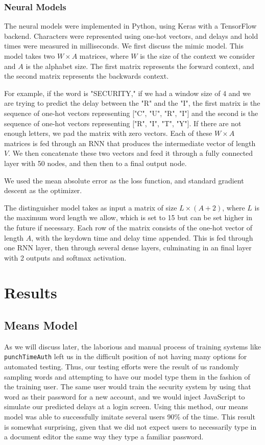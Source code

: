 \documentclass[9pt,journal]{IEEEtran}
\begin{document}
\subsubsection{Neural Models}
The neural models were implemented in Python, using Keras with a TensorFlow backend. Characters were represented using one-hot vectors, and delays and hold times were measured in milliseconds. We first discuss the mimic model. This model takes two $W \times A$ matrices, where $W$ is the size of the context we consider and $A$ is the alphabet size. The first matrix represents the forward context, and the second matrix represents the backwards context.

For example, if the word is "SECURITY," if we had a window size of 4 and we are trying to predict the delay between the "R" and the "I", the first matrix is the sequence of one-hot vectors representing ["C", "U", "R", "I"] and the second is the sequence of one-hot vectors representing ["R", "I", "T", "Y"]. If there are not enough letters, we pad the matrix with zero vectors. Each of these $W \times A$ matrices is fed through an RNN that produces the intermediate vector of length $V$. We then concatenate these two vectors and feed it through a fully connected layer with 50 nodes, and then then to a final output node.

We used the mean absolute error as the loss function, and standard gradient descent as the optimizer.

The distinguisher model takes as input a matrix of size $L \times (A + 2)$, where $L$ is the maximum word length we allow, which is set to 15 but can be set higher in the future if necessary. Each row of the matrix consists of the one-hot vector of length $A$, with the keydown time and delay time appended. This is fed through one RNN layer, then through several dense layers, culminating in an final layer with 2 outputs and softmax activation.

\section{Results}
\subsection{Means Model}

As we will discuss later, the laborious and manual process of training systems like \texttt{punchTimeAuth} left us in the difficult position of not having many options for automated testing. Thus, our testing efforts were the result of us randomly sampling words and attempting to have our model type them in the fashion of the training user. The same user would train the security system by using that word as their password for a new account, and we would inject JavaScript to simulate our predicted delays at a login screen. Using this method, our means model was able to successfully imitate several users 90\% of the time. This result is somewhat surprising, given that we did not expect users to necessarily type in a document editor the same way they type a familiar password.
\end{document}
